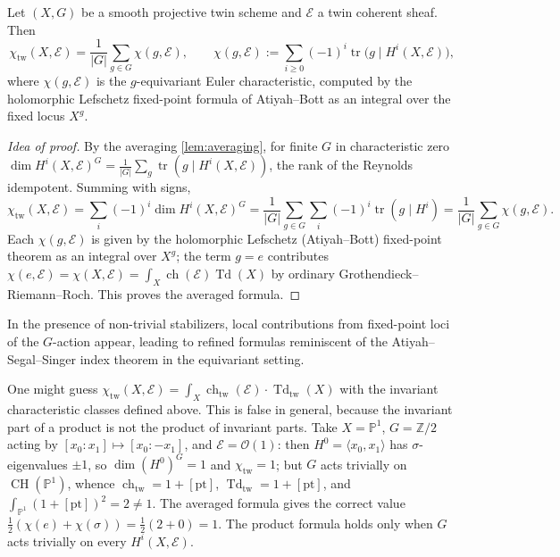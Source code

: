 \documentclass[11pt,a4paper]{article}
\numberwithin{equation}{section}
\newcommand{\Z}{\mathbb{Z}}
\DeclareMathOperator{\CH}{CH}
\newcommand{\Ocal}{\mathcal{O}}
\newcommand{\Ecal}{\mathcal{E}}
\newcommand{\abs}[1]{\left\lvert #1 \right\rvert}
\begin{document}
	\begin{theorem}\label{thm:RR-twin}
		Let $(X,G)$ be a smooth projective twin scheme and $\Ecal$ a twin coherent sheaf.
		Then
		\[
		\chi_{\mathrm{tw}}(X,\Ecal) 
		= \frac{1}{\abs{G}}\sum_{g\in G}\chi(g,\Ecal),
		\qquad
		\chi(g,\Ecal):=\sum_{i\ge0}(-1)^i\operatorname{tr}\!\big(g\mid H^i(X,\Ecal)\big),
		\]
		where $\chi(g,\Ecal)$ is the $g$-equivariant Euler characteristic, computed by the holomorphic Lefschetz
		fixed-point formula of Atiyah--Bott as an integral over the fixed locus $X^g$.
	\end{theorem}
	
	\begin{proof}[Idea of proof]
		By the averaging \cref{lem:averaging}, for finite $G$ in characteristic zero
		$\dim H^i(X,\Ecal)^G=\tfrac1{\abs G}\sum_{g}\operatorname{tr}(g\mid H^i(X,\Ecal))$, the rank of the Reynolds
		idempotent. Summing with signs,
		\[
			\chi_{\mathrm{tw}}(X,\Ecal)=\sum_i(-1)^i\dim H^i(X,\Ecal)^G
			=\frac1{\abs G}\sum_{g\in G}\sum_i(-1)^i\operatorname{tr}(g\mid H^i)
			=\frac1{\abs G}\sum_{g\in G}\chi(g,\Ecal).
		\]
		Each $\chi(g,\Ecal)$ is given by the holomorphic Lefschetz (Atiyah--Bott) fixed-point theorem as an integral
		over $X^g$; the term $g=e$ contributes $\chi(e,\Ecal)=\chi(X,\Ecal)=\int_X\operatorname{ch}(\Ecal)\operatorname{Td}(X)$
		by ordinary Grothendieck--Riemann--Roch. This proves the averaged formula.
		
		 
		
		
	\end{proof}
	
	\begin{remark}
		In the presence of non-trivial stabilizers, local contributions from fixed-point loci of the $G$-action appear,
		leading to refined formulas reminiscent of the Atiyah--Segal--Singer index theorem in the equivariant setting.
	\end{remark}

	\begin{remark}\label{rem:RR-warning}
		One might guess $\chi_{\mathrm{tw}}(X,\Ecal)=\int_X\operatorname{ch}_{\mathrm{tw}}(\Ecal)\cdot\operatorname{Td}_{\mathrm{tw}}(X)$
		with the invariant characteristic classes defined above. This is false in general, because the invariant
		part of a product is not the product of invariant parts. Take $X=\mathbb P^1$, $G=\Z/2$ acting by
		$[x_0:x_1]\mapsto[x_0:-x_1]$, and $\Ecal=\Ocal(1)$: then $H^0=\langle x_0,x_1\rangle$ has $\sigma$-eigenvalues
		$\pm1$, so $\dim(H^0)^G=1$ and $\chi_{\mathrm{tw}}=1$; but $G$ acts trivially on $\CH(\mathbb P^1)$, whence
		$\operatorname{ch}_{\mathrm{tw}}=1+[\mathrm{pt}]$, $\operatorname{Td}_{\mathrm{tw}}=1+[\mathrm{pt}]$, and
		$\int_{\mathbb P^1}(1+[\mathrm{pt}])^2=2\neq1$. The averaged formula gives the correct value
		$\tfrac12(\chi(e)+\chi(\sigma))=\tfrac12(2+0)=1$. The product formula holds only when $G$ acts trivially on
		every $H^i(X,\Ecal)$.
	\end{remark}
	
\end{document}
